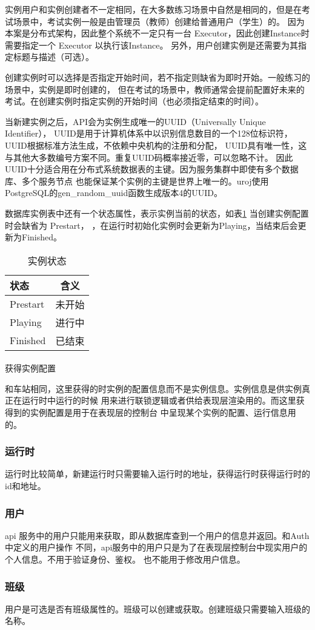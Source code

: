 实例用户和实例创建者不一定相同，在大多数练习场景中自然是相同的，但是在考试场景中，考试实例一般是由管理员（教师）创建给普通用户（学生）的。
因为本案是分布式架构，因此整个系统不一定只有一台 Executor，因此创建Instance时需要指定一个 Executor 以执行该Instance。
另外，用户创建实例是还需要为其指定标题与描述（可选）。

创建实例时可以选择是否指定开始时间，若不指定则缺省为即时开始。一般练习的场景中，实例是即时创建的，
但在考试的场景中，教师通常会提前配置好未来的考试。在创建实例时指定实例的开始时间（也必须指定结束的时间）。

当新建实例之后，API会为实例生成唯一的UUID（Universally Unique Identifier），
UUID是用于计算机体系中以识别信息数目的一个128位标识符，
UUID根据标准方法生成，不依赖中央机构的注册和分配，
UUID具有唯一性，这与其他大多数编号方案不同。重复UUID码概率接近零，可以忽略不计。
因此UUID十分适合用在分布式系统数据表的主键。因为服务集群中即使有多个数据库、多个服务节点
也能保证某个实例的主键是世界上唯一的。uroj使用PostgreSQL的gen\_random\_uuid函数生成版本4的UUID。

数据库实例表中还有一个状态属性，表示实例当前的状态，如表\ref{ins_state} 当创建实例配置时会缺省为 Prestart，
，在运行时初始化实例时会更新为Playing，当结束后会更新为Finished。

\begin{table}[htpb!]
    \centering
    \caption{\label{ins_state}实例状态}
    \begin{tabular}{lc}
        \toprule
        状态     & 含义   \\
        \midrule
        Prestart & 未开始 \\
        Playing  & 进行中 \\
        Finished & 已结束 \\
        \bottomrule
    \end{tabular}
\end{table}

\paragraph{}获得实例配置

和车站相同，这里获得的时实例的配置信息而不是实例信息。实例信息是供实例真正在运行时中运行的时候
用来进行联锁逻辑或者供给表现层渲染用的。而这里获得到的实例配置是用于在表现层的控制台
中呈现某个实例的配置、运行信息用的。

\subsubsection{运行时}
运行时比较简单，新建运行时只需要输入运行时的地址，获得运行时获得运行时的id和地址。

\subsubsection{用户}
api 服务中的用户只能用来获取，即从数据库查到一个用户的信息并返回。和Auth中定义的用户操作
不同，api服务中的用户只是为了在表现层控制台中现实用户的个人信息。不用于验证身份、鉴权。
也不能用于修改用户信息。

\subsubsection{班级}
用户是可选是否有班级属性的。班级可以创建或获取。创建班级只需要输入班级的名称。